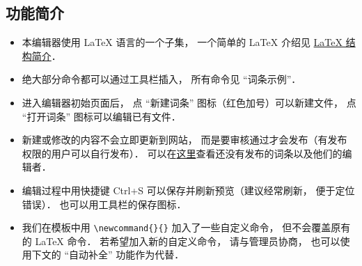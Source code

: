 \subsection{功能简介}

\begin{itemize}
\item 本编辑器使用 LaTeX 语言的一个子集， 一个简单的 LaTeX 介绍见 \href{https://wuli.wiki/online/latxIn.html}{LaTeX 结构简介}．
\item 绝大部分命令都可以通过工具栏插入， 所有命令见 “词条示例”．
\item 进入编辑器初始页面后， 点 “新建词条” 图标（红色加号）可以新建文件， 点 “打开词条” 图标可以编辑已有文件．
\item 新建或修改的内容不会立即更新到网站， 而是要审核通过才会发布（有发布权限的用户可以自行发布）． 可以在\href{https://wuli.wiki/changed/changed.html}{这里}查看还没有发布的词条以及他们的编辑者．
\item 编辑过程中用快捷键 Ctrl+S 可以保存并刷新预览（建议经常刷新， 便于定位错误）． 也可以用工具栏的保存图标．
\item 我们在模板中用 \verb|\newcommand{}{}| 加入了一些自定义命令， 但不会覆盖原有的 LaTeX 命令． 若希望加入新的自定义命令， 请与管理员协商， 也可以使用下文的 “自动补全” 功能作为代替．
\end{itemize}


